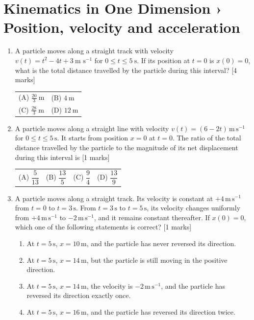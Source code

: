 \documentclass[11pt,a4paper]{article}
\begin{document}
\section*{Kinematics in One Dimension › Position, velocity and acceleration}
\begin{enumerate}[resume]
\item A particle moves along a straight track with velocity $v(t)=t^2-4t+3\ \text{m s}^{-1}$ for $0\le t\le 5\ \text{s}$. If its position at $t=0$ is $x(0)=0$, what is the total distance travelled by the particle during this interval? \hfill [4 marks]
{\renewcommand{\arraystretch}{1.8}
\begin{tabularx}{\linewidth}{X X}
(A) \quad $\frac{20}{3}\ \text{m}$ & (B) \quad $4\ \text{m}$ \\[10pt]
(C) \quad $\frac{28}{3}\ \text{m}$ & (D) \quad $12\ \text{m}$ \\[10pt]
\end{tabularx}}
\item A particle moves along a straight line with velocity $v(t)=(6-2t)\,\mathrm{m\,s^{-1}}$ for $0\le t\le 5\,\mathrm{s}$. It starts from position $x=0$ at $t=0$. The ratio of the total distance travelled by the particle to the magnitude of its net displacement during this interval is \hfill [1 marks]
{\renewcommand{\arraystretch}{1.8}
\begin{tabularx}{\linewidth}{X X X X}
(A) \quad $\dfrac{5}{13}$ & (B) \quad $\dfrac{13}{5}$ & (C) \quad $\dfrac{9}{4}$ & (D) \quad $\dfrac{13}{9}$ \\[10pt]
\end{tabularx}}
\item A particle moves along a straight track. Its velocity is constant at $+4\,\mathrm{m\,s^{-1}}$ from $t=0$ to $t=3\,\mathrm{s}$. From $t=3\,\mathrm{s}$ to $t=5\,\mathrm{s}$, its velocity changes uniformly from $+4\,\mathrm{m\,s^{-1}}$ to $-2\,\mathrm{m\,s^{-1}}$, and it remains constant thereafter. If $x(0)=0$, which one of the following statements is correct? \hfill [1 marks]
\begin{enumerate}[label=(\Alph*),leftmargin=1.6em,itemsep=1pt]\item At $t=5\,\mathrm{s}$, $x=10\,\mathrm{m}$, and the particle has never reversed its direction. \item At $t=5\,\mathrm{s}$, $x=14\,\mathrm{m}$, but the particle is still moving in the positive direction. \item At $t=5\,\mathrm{s}$, $x=14\,\mathrm{m}$, the velocity is $-2\,\mathrm{m\,s^{-1}}$, and the particle has reversed its direction exactly once. \item At $t=5\,\mathrm{s}$, $x=16\,\mathrm{m}$, and the particle has reversed its direction twice.\end{enumerate}

\end{enumerate}
\end{document}
